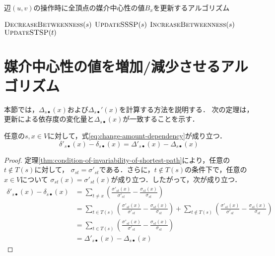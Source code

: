 \begin{algorithm}[tb]
  \caption{辺$(u,v)$の操作時に全頂点の媒介中心性の値$B_x$を更新するアルゴリズム}
  \label{alg:proposed-algorithm-full}
  \begin{algorithmic}[1]\small
    \State $\textproc{DecreaseBetweenness}(s)$
    \State $\textproc{UpdateSSSP}(s)$
    \State $\textproc{IncreaseBetweenness}(s)$
    \EndFor
    \State $\textproc{UpdateSTSP}(t)$
    \EndFor
    \EndProcedure
  \end{algorithmic}
\end{algorithm}

\section{媒介中心性の値を増加/減少させるアルゴリズム}
\label{sect:update-betweenness}

本節では，$\Delta_{s\bullet}(x)$および$\Delta_{s\bullet}'(x)$を計算する方法を説明する．
次の定理は，更新による依存度の変化量と$\Delta_{s\bullet}(x)$が一致することを示す．
\begin{theorem}
  任意の$s,x\in V$に対して，式\eqref{eq:change-amount-dependency}が成り立つ．
  \begin{equation}
    \delta'_{s\bullet}(x)-\delta_{s\bullet}(x)=\Delta'_{s\bullet}(x)-\Delta_{s\bullet}(x)
    \label{eq:change-amount-dependency}
  \end{equation}
\end{theorem}
\begin{proof}
  定理\ref{thm:condition-of-invariability-of-shortest-path}により，任意の$t\notin T(s)$に対して，
  $\sigma_{st}=\sigma'_{st}$である．さらに，$t\notin T(s)$の条件下で，任意の$x\in V$について
  $\sigma_{st}(x)=\sigma'_{st}(x)$が成り立つ．したがって，次が成り立つ．
  \begin{equation*}
    \begin{aligned}
      \delta'_{s\bullet}(x)-\delta_{s\bullet}(x)
      &=\sum_{t\neq x}\left(\frac{\sigma'_{st}(x)}{\sigma'_{st}}-\frac{\sigma_{st}(x)}{\sigma_{st}}\right) \\
      &=\sum_{t\in T(s)}\left(\frac{\sigma'_{st}(x)}{\sigma'_{st}}-\frac{\sigma_{st}(x)}{\sigma_{st}}\right)
      +\sum_{t\notin T(s)}\left(\frac{\sigma'_{st}(x)}{\sigma'_{st}}-\frac{\sigma_{st}(x)}{\sigma_{st}}\right) \\
      &=\sum_{t\in T(s)}\left(\frac{\sigma'_{st}(x)}{\sigma'_{st}}-\frac{\sigma_{st}(x)}{\sigma_{st}}\right) \\
      &=\Delta'_{s\bullet}(x)-\Delta_{s\bullet}(x)
    \end{aligned}
  \end{equation*}
\end{proof}

